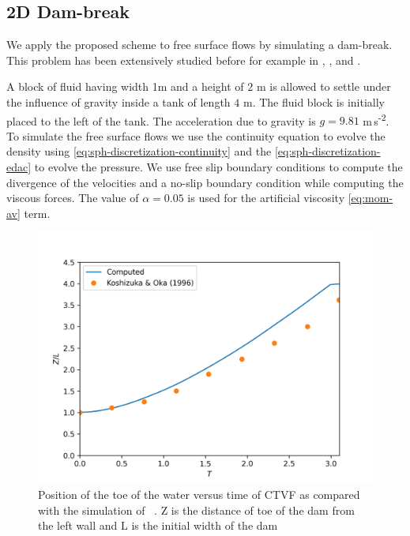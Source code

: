 \documentclass[preprint,12pt]{elsarticle}
\begin{document}
\FloatBarrier%

\subsection{2D Dam-break}

We apply the proposed scheme to free surface flows by simulating a
dam-break. This problem has been extensively studied before for example in
\cite{muta_efficient_2020}, \cite{zhang_hu_adams17}, and
\cite{edac-sph:cf:2019}.

A block of fluid having width 1m and a height of $2$ m is allowed to settle
under the influence of gravity inside a tank of length $4$ m. The fluid block
is initially placed to the left of the tank. The acceleration due to gravity
is $g=9.81$ m\,s\textsuperscript{-2}. To simulate the free surface flows we
use the continuity equation to evolve the density using
\eqref{eq:sph-discretization-continuity} and the
\eqref{eq:sph-discretization-edac} to evolve the pressure. We use free slip
boundary conditions to compute the divergence of the velocities and a no-slip
boundary condition while computing the viscous forces. The value of
$\alpha=0.05$ is used for the artificial viscosity \cref{eq:mom-av} term.

\begin{figure}[!htpb]
  \centering
  \includegraphics[width=1\linewidth]{fig_16}
  \caption{Position of the toe of the water versus time of CTVF as compared
    with the simulation of ~\cite{koshizuka1996moving}. Z is the
    distance of toe of the dam from the left wall and L is the initial width
    of the dam}
\label{fig:dam-break}
\end{figure}
\end{document}
